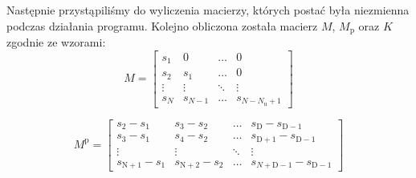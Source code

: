 Następnie przystąpiliśmy do wyliczenia macierzy, których postać była niezmienna podczas działania programu. Kolejno obliczona została macierz $M$, $M_\mathrm{p}$ oraz $K$ zgodnie ze wzorami:
\\

\begin{equation}
M=\left[
\begin{array}
{cccc}
s_{1} & 0 & \ldots & 0\\
s_{2} & s_{1} & \ldots & 0\\
\vdots & \vdots & \ddots & \vdots\\
s_{N} & s_{N-1} & \ldots &  s_{N-N_{\mathrm{u}}+1}
\end{array}
\right]
\end{equation}

\begin{equation}
M^{\mathrm{p}}=\left[
\begin{array}
{cccc}
s_{\mathrm{2}} - s_{\mathrm{1}} & s_{\mathrm{3}} - s_{\mathrm{2}} & \ldots & s_{\mathrm{D}} - s_{\mathrm{D-1}}\\
s_{\mathrm{3}} - s_{\mathrm{1}} & s_{\mathrm{4}} - s_{\mathrm{2}} & \ldots & s_{\mathrm{D+1}} - s_{\mathrm{D-1}}\\
\vdots & \vdots & \ddots & \vdots\\
s_{\mathrm{N+1}} - s_{1} & s_{\mathrm{N+2}} - s_{\mathrm{2}} & \ldots &  s_{N + \mathrm{D} - 1} - s_{{\mathrm{D-1}}}
\end{array}
\right]
\end{equation}
\\


